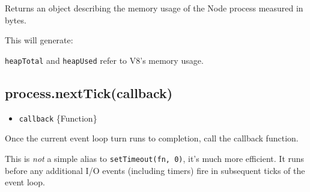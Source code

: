 Returns an object describing the memory usage of the Node process
measured in bytes.

\begin{Shaded}
\begin{Highlighting}[]
 \NormalTok{(}\NormalTok{);}

\NormalTok{(}\NormalTok{(}\NormalTok{()));}
\end{Highlighting}
\end{Shaded}

This will generate:

\begin{Shaded}
\begin{Highlighting}[]
\NormalTok{\{ }\NormalTok{: }\NormalTok{,}
  \NormalTok{: }\NormalTok{,}
  \NormalTok{: } \NormalTok{\}}
\end{Highlighting}
\end{Shaded}

\texttt{heapTotal} and \texttt{heapUsed} refer to V8's memory usage.

\subsection{process.nextTick(callback)}\label{process.nexttickcallback}

\begin{itemize}
\itemsep1pt\parskip0pt
\item
  \texttt{callback} \{Function\}
\end{itemize}

Once the current event loop turn runs to completion, call the callback
function.

This is \emph{not} a simple alias to \texttt{setTimeout(fn,\ 0)}, it's
much more efficient. It runs before any additional I/O events (including
timers) fire in subsequent ticks of the event loop.

\begin{Shaded}
\begin{Highlighting}[]
\NormalTok{(}\NormalTok{);}
\NormalTok{(}\NormalTok{() \{}
  \NormalTok{(}\NormalTok{);}
\NormalTok{\});}
\NormalTok{(}\NormalTok{);}
\end{Highlighting}
\end{Shaded}

